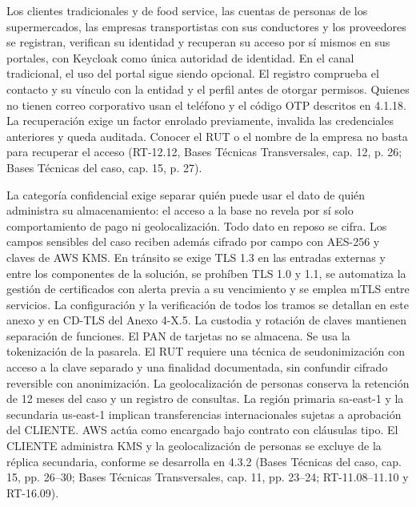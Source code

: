 Los clientes tradicionales y de food service, las cuentas de personas de los supermercados, las empresas transportistas con sus conductores y los proveedores se registran, verifican su identidad y recuperan su acceso por sí mismos en sus portales, con Keycloak como única autoridad de identidad. En el canal tradicional, el uso del portal sigue siendo opcional. El registro comprueba el contacto y su vínculo con la entidad y el perfil antes de otorgar permisos. Quienes no tienen correo corporativo usan el teléfono y el código OTP descritos en 4.1.18. La recuperación exige un factor enrolado previamente, invalida las credenciales anteriores y queda auditada. Conocer el RUT o el nombre de la empresa no basta para recuperar el acceso (RT-12.12, Bases Técnicas Transversales, cap. 12, p. 26; Bases Técnicas del caso, cap. 15, p. 27).

La categoría confidencial exige separar quién puede usar el dato de quién administra su almacenamiento: el acceso a la base no revela por sí solo comportamiento de pago ni geolocalización. Todo dato en reposo se cifra. Los campos sensibles del caso reciben además cifrado por campo con AES-256 y claves de AWS KMS. En tránsito se exige TLS 1.3 en las entradas externas y entre los componentes de la solución, se prohíben TLS 1.0 y 1.1, se automatiza la gestión de certificados con alerta previa a su vencimiento y se emplea mTLS entre servicios. La configuración y la verificación de todos los tramos se detallan en este anexo y en CD-TLS del Anexo 4-X.5. La custodia y rotación de claves mantienen separación de funciones. El PAN de tarjetas no se almacena. Se usa la tokenización de la pasarela. El RUT requiere una técnica de seudonimización con acceso a la clave separado y una finalidad documentada, sin confundir cifrado reversible con anonimización. La geolocalización de personas conserva la retención de 12 meses del caso y un registro de consultas. La región primaria sa-east-1 y la secundaria us-east-1 implican transferencias internacionales sujetas a aprobación del CLIENTE. AWS actúa como encargado bajo contrato con cláusulas tipo. El CLIENTE administra KMS y la geolocalización de personas se excluye de la réplica secundaria, conforme se desarrolla en 4.3.2 (Bases Técnicas del caso, cap. 15, pp. 26–30; Bases Técnicas Transversales, cap. 11, pp. 23–24; RT-11.08–11.10 y RT-16.09).

\label{fuente-21-anexo-4-1-r-controles-seguridad-fin}
